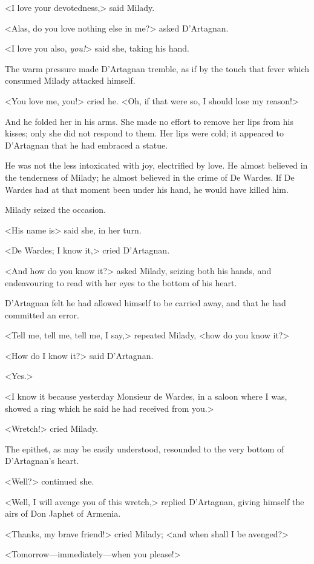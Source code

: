 <I love your devotedness,> said Milady. 

<Alas, do you love nothing else in me?> asked D'Artagnan. 

<I love you also, \emph{you!}> said she, taking his hand. 

The warm pressure made D'Artagnan tremble, as if by the touch that fever which consumed Milady attacked himself. 

<You love me, you!> cried he. <Oh, if that were so, I should lose my reason!> 

And he folded her in his arms. She made no effort to remove her lips from his kisses; only she did not respond to them. Her lips were cold; it appeared to D'Artagnan that he had embraced a statue. 

He was not the less intoxicated with joy, electrified by love. He almost believed in the tenderness of Milady; he almost believed in the crime of De Wardes. If De Wardes had at that moment been under his hand, he would have killed him. 

Milady seized the occasion. 

<His name is\longdash> said she, in her turn. 

<De Wardes; I know it,> cried D'Artagnan. 

<And how do you know it?> asked Milady, seizing both his hands, and endeavouring to read with her eyes to the bottom of his heart. 

D'Artagnan felt he had allowed himself to be carried away, and that he had committed an error. 

<Tell me, tell me, tell me, I say,> repeated Milady, <how do you know it?> 

<How do I know it?> said D'Artagnan. 

<Yes.> 

<I know it because yesterday Monsieur de Wardes, in a saloon where I was, showed a ring which he said he had received from you.> 

<Wretch!> cried Milady. 

The epithet, as may be easily understood, resounded to the very bottom of D'Artagnan's heart. 

<Well?> continued she. 

<Well, I will avenge you of this wretch,> replied D'Artagnan, giving himself the airs of Don Japhet of Armenia. 

<Thanks, my brave friend!> cried Milady; <and when shall I be avenged?> 

<Tomorrow—immediately—when you please!> 

